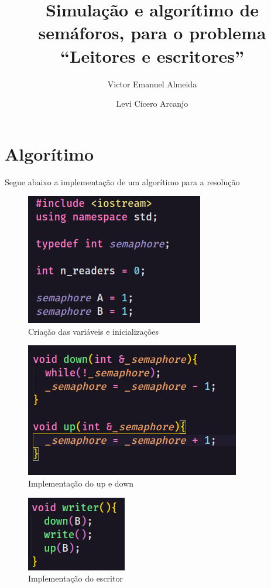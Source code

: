 \documentclass[12pt, a4paper]{article}
\author{Victor Emanuel Almeida \and Levi Cícero Arcanjo}
\title{Simulação e algorítimo de semáforos, para o problema ``Leitores e escritores''}
\begin{document}
\maketitle\thispagestyle{fancy}

\section{Algorítimo}

Segue abaixo a implementação de um algorítimo para a resolução 

\begin{figure}[!htb]
	\centering
	\caption{\label{fig:1.png} Criação das variáveis e inicializações}
	\includegraphics[keepaspectratio]{1.png}
\end{figure}

\clearpage

\begin{figure}[!htb]
	\centering
	\caption{\label{fig:2.png} Implementação do up e down}
	\includegraphics[keepaspectratio]{2.png}
\end{figure}

\begin{figure}[!htb]
	\centering
	\caption{\label{fig:3.png} Implementação do escritor}
	\includegraphics[keepaspectratio, scale=1.4]{3.png}
\end{figure}
\end{document}
